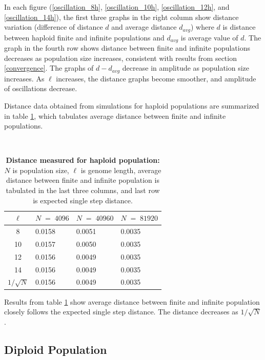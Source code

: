 In each figure (\ref{oscillation_8h}, \ref{oscillation_10h}, \ref{oscillation_12h}, 
and \ref{oscillation_14h}), the first three graphs in the right column show 
distance variation (difference of distance $d$ and average distance $d_{avg}$)  
where $d$ is distance between haploid finite and infinite populations and $d_{avg}$ is average value of $d$. 
The graph in the fourth row shows distance between finite and infinite populations decreases 
as population size increases, consistent with results from section \ref{convergence}. 
The graphs of $d-d_{avg}$ decrease in amplitude as population size increases. 
As $\ell$ increases, the distance graphs become smoother, and amplitude of oscillations decrease. 

Distance data obtained from simulations for haploid populations are summarized in table \ref{tableDistanceOscHap},  
which tabulates average distance between finite and infinite populations. 

\mbox{}\\[-0.5in]
\begin{table}[h]
\caption[\textbf{Distance measured for haploid population}]{\textbf{Distance measured for haploid population:} $N$ is population size, $\ell$ is genome length, 
average distance between finite and infinite population is tabulated in the last three columns, and last row is expected single step distance.}
\centering
\begin{tabularx}{0.75\textwidth}{ c *{3}{X}}
\toprule
$\ell$ & $N \;=\; 4096 $ & $N \;=\; 40960 $ & $N \;=\; 81920 $\\
\midrule
8 & 0.0158 & 0.0051 & 0.0035 \\
10 & 0.0157 & 0.0050 & 0.0035 \\ 
12 & 0.0156 & 0.0049 & 0.0035 \\
14 & 0.0156 & 0.0049 & 0.0035 \\ 
\midrule
$1/\sqrt{N}$ & 0.0156 & 0.0049 & 0.0035 \\
\bottomrule
\end{tabularx}
\label{tableDistanceOscHap}
\end{table}

Results from table \ref{tableDistanceOscHap} show average distance between finite and infinite population closely follows 
the expected single step distance. The distance decreases as $1/\sqrt{N}$.

\subsection{Diploid Population}

\clearpage

